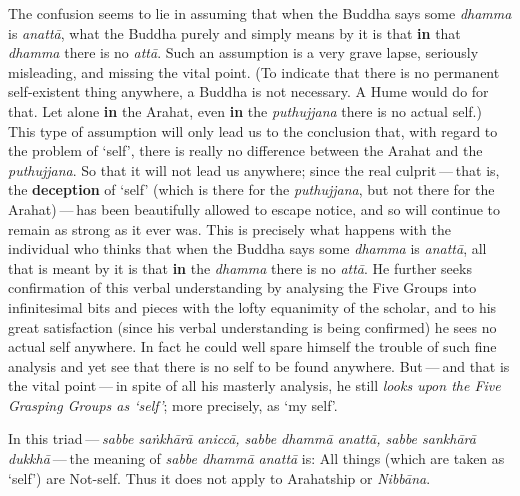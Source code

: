 The confusion seems to lie in assuming that when the Buddha says some \emph{dhamma} is \emph{anattā}, what the Buddha purely and simply means by it is that \textbf{in} that \emph{dhamma} there is no \emph{attā}. Such an assumption is a very grave lapse, seriously misleading, and missing the vital point. (To indicate that there is no permanent self-existent thing anywhere, a Buddha is not necessary. A Hume would do for that. Let alone \textbf{in} the Arahat, even \textbf{in} the \emph{puthujjana} there is no actual self.) This type of assumption will only lead us to the conclusion that, with regard to the problem of `self', there is really no difference between the Arahat and the \emph{puthujjana}. So that it will not lead us anywhere; since the real culprit --- that is, the \textbf{deception} of `self' (which is there for the \emph{puthujjana}, but not there for the Arahat) --- has been beautifully allowed to escape notice, and so will continue to remain as strong as it ever was. This is precisely what happens with the individual who thinks that when the Buddha says some \emph{dhamma} is \emph{anattā}, all that is meant by it is that \textbf{in} the \emph{dhamma} there is no \emph{attā}. He further seeks confirmation of this verbal understanding by analysing the Five Groups into infinitesimal bits and pieces with the lofty equanimity of the scholar, and to his great satisfaction (since his verbal understanding is being confirmed) he sees no actual self anywhere. In fact he could well spare himself the trouble of such fine analysis and yet see that there is no self to be found anywhere. But --- and that is the vital point --- in spite of all his masterly analysis, he still \emph{looks upon the Five Grasping Groups as `self'}; more precisely, as `my self'.

In this triad --- \emph{sabbe saṅkhārā aniccā, sabbe dhammā anattā, sabbe sankhārā dukkhā} --- the meaning of \emph{sabbe dhammā anattā} is: All things (which are taken as `self') are Not-self. Thus it does not apply to Arahatship or \emph{Nibbāna}.

